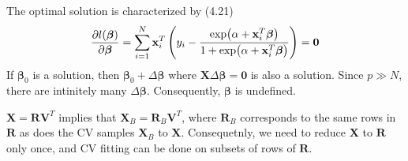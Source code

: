 \begin{exercise}
  The optimal solution is characterized by (4.21)
  \begin{align}
    \pdv{l(\bm{\beta})}{\bm{\beta}} = \sum_{i=1}^N\mathbf{x}_i^T 
    \left(y_i - \frac{\exp(\alpha + \mathbf{x}_i^T\bm{\beta})}{1 + \exp(\alpha +
    \mathbf{x}_i^T\bm{\beta})} \right) = \mathbf{0}
  \end{align}
  If $\bm{\beta}_0$ is a solution, then $\bm{\beta}_0 + \Delta\bm{\beta}$ where
  $\mathbf{X}\Delta\bm{\beta} = \mathbf{0}$ is also a solution. Since $p\gg N$,
  there are intinitely many $\Delta\bm{\beta}$. Consequently, $\bm{\beta}$ is
  undefined.
\end{exercise}

\begin{exercise}
  $\mathbf{X} = \mathbf{RV}^T$ implies that $\mathbf{X}_B =
  \mathbf{R}_B\mathbf{V}^T$, where $\mathbf{R}_B$ corresponds to the same rows
  in $\mathbf{R}$ as does the CV samples $\mathbf{X}_B$ to $\mathbf{X}$.
  Consequetnly, we need to reduce $\mathbf{X}$ to $\mathbf{R}$ only once, and CV
  fitting can be done on subsets of rows of $\mathbf{R}$.
\end{exercise}

